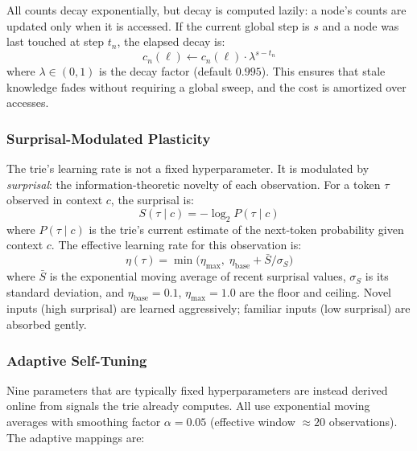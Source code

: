 All counts decay exponentially, but decay is computed lazily: a node's
counts are updated only when it is accessed.  If the current global step
is $s$ and a node was last touched at step $t_n$, the elapsed decay is:
\begin{equation}
  c_n(\ell) \leftarrow c_n(\ell) \cdot \lambda^{s - t_n}
  \label{eq:lazy_decay}
\end{equation}
where $\lambda \in (0,1)$ is the decay factor (default $0.995$).  This
ensures that stale knowledge fades without requiring a global sweep, and
the cost is amortized over accesses.

\subsubsection{Surprisal-Modulated Plasticity}
\label{sec:surprisal_plasticity}

The trie's learning rate is not a fixed hyperparameter.  It is modulated
by \emph{surprisal}: the information-theoretic novelty of each
observation.  For a token $\tau$ observed in context $c$, the surprisal
is:
\begin{equation}
  S(\tau \mid c) = -\log_2 P(\tau \mid c)
  \label{eq:surprisal}
\end{equation}
where $P(\tau \mid c)$ is the trie's current estimate of the next-token
probability given context $c$.  The effective learning rate for this
observation is:
\begin{equation}
  \eta(\tau) = \min\!\bigl(\eta_{\max},\;
    \eta_{\text{base}} + \bar{S} / \sigma_S\bigr)
  \label{eq:adaptive_lr}
\end{equation}
where $\bar{S}$ is the exponential moving average of recent surprisal
values, $\sigma_S$ is its standard deviation, and $\eta_{\text{base}} =
0.1$, $\eta_{\max} = 1.0$ are the floor and ceiling.  Novel inputs
(high surprisal) are learned aggressively; familiar inputs (low
surprisal) are absorbed gently.

\subsubsection{Adaptive Self-Tuning}

Nine parameters that are typically fixed hyperparameters are instead
derived online from signals the trie already computes.  All use
exponential moving averages with smoothing factor $\alpha = 0.05$
(effective window $\approx 20$ observations).  The adaptive mappings
are:

